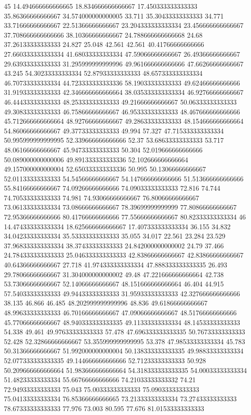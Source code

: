 45 14.494666666666665 18.834666666666667 17.450333333333333 35.86366666666667 34.574000000000005 33.711 35.30433333333333 34.771 33.71666666666667 22.51366666666667 23.204333333333334 23.456666666666667 37.708666666666666 38.10366666666667 24.788666666666668 24.68 37.26133333333333 24.827 25.048 42.561 42.561 40.41766666666666 27.660333333333334 41.68033333333334 47.59066666666667 26.49366666666667 29.63933333333333 31.295999999999996 49.961666666666666 47.66266666666667 43.245 54.30233333333334 52.87933333333333 48.657333333333334 46.70733333333334 44.723333333333336 58.19033333333333 49.62466666666666 31.91933333333333 42.346666666666664 38.035333333333334 46.92766666666667 46.44433333333333 48.25333333333333 49.21666666666667 50.06333333333333 49.30833333333333 46.75866666666667 46.95333333333333 48.467666666666666 45.712666666666664 48.92766666666667 49.28633333333333 48.154666666666664 54.86066666666667 49.37733333333333 49.994 57.327 47.715333333333334 50.995999999999995 52.339666666666666 52.37 53.68633333333333 53.717 48.06166666666667 45.94733333333333 50.304 52.019666666666666 50.089000000000006 49.891333333333336 52.102666666666664 49.157000000000004 52.650333333333336 50.995 50.13066666666667 52.01133333333333 54.54566666666667 54.147666666666666 51.513666666666666 55.84166666666667 74.09266666666666 74.09033333333333 72.816 74.744 74.70533333333333 74.981 74.93066666666667 76.80066666666667 73.06133333333334 73.08666666666667 78.39699999999999 77.80866666666667 72.95366666666666 80.41766666666666 77.55666666666667 80.82333333333334
46 14.474333333333334 18.625666666666667 17.407333333333334 36.155 34.832 34.04233333333334 35.53333333333333 35.055 34.017 22.561 23.284 23.529 37.968333333333334 38.37433333333333 24.842000000000002 24.79 37.466 24.784333333333333 25.046333333333333 42.83866666666667 42.83866666666667 40.64366666666667 27.718 41.974333333333334 47.888333333333335 26.493 29.78066666666667 31.304000000000002 49.48 47.221666666666664 42.738 53.73066666666667 52.14066666666667 48.151666666666664 46.404 44.915 57.54033333333333 49.94433333333333 31.95933333333333 42.327666666666666 38.135 46.866 46.485 48.202999999999996 48.836 49.61866666666667 48.99633333333333 46.70166666666667 47.09066666666667 48.51766666666666 45.77066666666667 48.940333333333335 49.11333333333334 48.14533333333333 54.338 49.461 49.97633333333333 57.478 47.696333333333335 50.76733333333333 52.428 52.32866666666667 53.355999999999995 53.378 47.98533333333334 45.783 50.31366666666667 51.992000000000004 50.138333333333335 49.98833333333334 52.077333333333335 49.144666666666666 52.71233333333333 50.928 50.209666666666664 51.983666666666664 54.318333333333335 54.00033333333334 51.48233333333334 55.66766666666666 74.21033333333332 74.21 72.94933333333333 75.043 75.00333333333333 75.09033333333333 75.04133333333334 76.85366666666665 73.21333333333334 73.27433333333333 78.67333333333333 77.976 73.003 80.595 77.676 81.01533333333333
